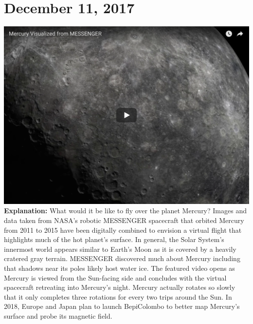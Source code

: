 \documentclass{article}%
\begin{document}
\section*{December 11, 2017}%
\includegraphics[width=\textwidth]{../lib/pictures/171211.jpg}%
\textbf{\newline%
\newline%
Explanation:\newline%
}%
    What would it be like to fly over the planet Mercury?  Images and data taken from NASA's robotic  MESSENGER spacecraft that  orbited Mercury from 2011 to 2015 have been digitally combined to envision a virtual flight that highlights much of the hot planet's surface.   In general,  the Solar System's innermost world appears similar to  Earth's Moon as it is covered by a heavily cratered gray terrain.  MESSENGER discovered much  about Mercury including that shadows near its poles likely host water ice.   The featured video opens as  Mercury is viewed from the Sun{-}facing side and concludes with the virtual spacecraft  retreating into Mercury's night.   Mercury actually rotates so slowly that it only completes three rotations for every two trips around the Sun.   In 2018, Europe and Japan plan to launch  BepiColombo  to better map Mercury's surface and  probe its  magnetic field.%
\newpage

%
\end{document}
